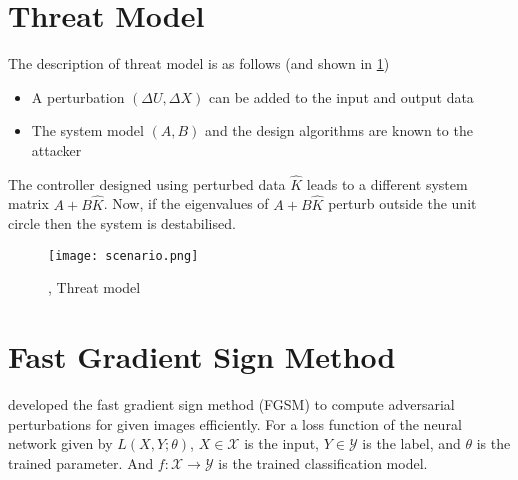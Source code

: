 \section{Threat Model}
The description of threat model is as follows (and shown in \ref{fig:scenario})
\begin{itemize}
\item A perturbation $(\Delta U, \Delta X)$ can be added to the input and output data
\item The system model $(A,B)$ and the design algorithms are known to the attacker
\end{itemize}
The controller designed using perturbed data $\hat{K}$ leads to a different system matrix $A+B\hat{K}$. Now, if the eigenvalues of $A+B\hat{K}$ perturb outside the unit circle then the system is destabilised.
\begin{figure}[H]
  \centering
  \texttt{[image: scenario.png]}
  \caption{\cite{10383531}, Threat model
  }
  \label{fig:scenario}
\end{figure}
\section{Fast Gradient Sign Method}
\cite{Goodfellow2015Explaining} developed the fast gradient sign method (FGSM) to compute adversarial perturbations for given images efficiently. For a loss function of the neural network given by $L(X,Y;\theta)$, $X\in\mathcal{X}$ is the input, $Y\in\mathcal{Y}$ is the label, and $\theta$ is the trained parameter. And $f:\mathcal{X}\to\mathcal{Y}$ is the trained classification model. 

